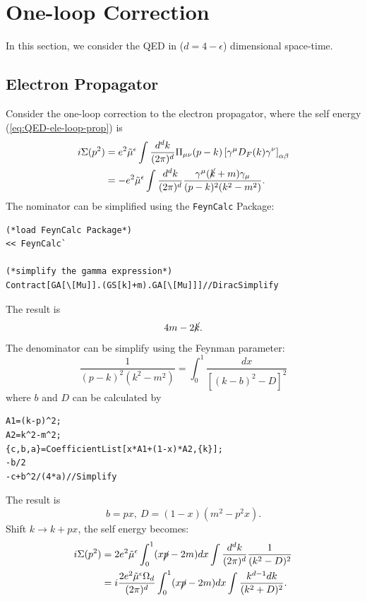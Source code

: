 \section{One-loop Correction}
In this section, we consider the QED in ($d=4-\epsilon$) dimensional space-time.
\subsection{Electron Propagator}
Consider the one-loop correction to the electron propagator, where the self energy (\ref{eq:QED-ele-loop-prop}) is
\begin{equation}
\begin{aligned}
	i\Sigma(p^2)
	&= e^2\tilde{\mu}^{\epsilon}\int\frac{d^d k}{(2\pi)^d} \Pi_{\mu\nu}(p-k) \left[\gamma^\mu D_F(k) \gamma^\nu \right]_{\alpha\beta} \\
	&= -e^2\tilde{\mu}^{\epsilon}\int\frac{d^d k}{(2\pi)^d}\frac{\gamma^\mu(\cancel{k}+m)\gamma_\mu}{(p-k)^2(k^2-m^2)}.
\end{aligned}
\end{equation}
The nominator can be simplified using the \texttt{FeynCalc} Package:
\begin{lstlisting}[style=mathematicaFrameTB]
(*load FeynCalc Package*)
<< FeynCalc`

(*simplify the gamma expression*)
Contract[GA[\[Mu]].(GS[k]+m).GA[\[Mu]]]//DiracSimplify	
\end{lstlisting}
The result is
\begin{equation*}
	4 m-2\cancel{k}.
\end{equation*}
The denominator can be simplify using the Feynman parameter:
\begin{equation*}
	\frac{1}{(p-k)^2(k^2-m^2)} = \int_0^1 \frac{dx}{\left[(k-b)^2-D\right]^2}
\end{equation*}
where $b$ and $D$ can be calculated by
\begin{lstlisting}[style=mathematicaFrameTB]
A1=(k-p)^2;
A2=k^2-m^2;
{c,b,a}=CoefficientList[x*A1+(1-x)*A2,{k}];
-b/2
-c+b^2/(4*a)//Simplify
\end{lstlisting}
The result is
\begin{equation*}
	b = p x,\ 
	D = (1-x)(m^2-p^2 x).
\end{equation*}
Shift $k \rightarrow k + px$, the self energy becomes:
\begin{equation}
\begin{aligned}
	i\Sigma(p^2)
	&= 2e^2\tilde{\mu}^{\epsilon} 
		\int_0^1 (x\cancel{p}-2m)dx 
		\int \frac{d^d k}{(2\pi)^d} 
		\frac{1}{(k^2-D)^2} \\
	&= i\frac{2e^2 \tilde{\mu}^{\epsilon}\Omega_d}{(2\pi)^d}
		\int_0^1 (x\cancel{p}-2m)dx
		\int \frac{k^{d-1} dk}{(k^2+D)^2}.
\end{aligned}
\end{equation}
